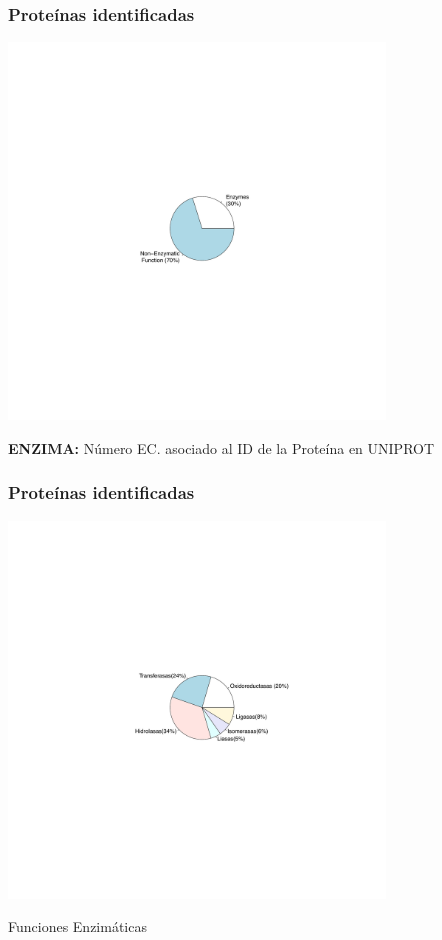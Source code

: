 \documentclass[10pt]{beamer}
\begin{document}
\begin{frame}
\frametitle{Proteínas identificadas}
\begin{center}
\includegraphics[width=10cm]{imagenes/ECProt}
\end{center}
\begin{center}
\textbf{ENZIMA:} Número EC. asociado al ID de la Proteína en UNIPROT
\end{center}
\end{frame}
\begin{frame}
\frametitle{Proteínas identificadas}
\begin{center}
\includegraphics[width=10cm]{imagenes/ECN}
\end{center}
\begin{center}
Funciones Enzimáticas
\end{center}
\end{frame}
\end{document}
